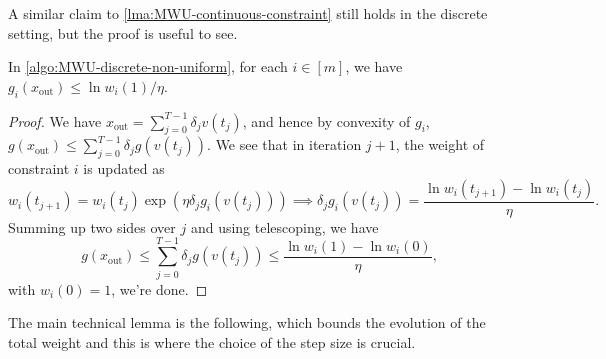 A similar claim to \autoref{lma:MWU-continuous-constraint} still holds in the discrete setting, but the proof is useful to see.

\begin{lemma}\label{lma:MWU-discrete-non-uniform-constraint}
	In \autoref{algo:MWU-discrete-non-uniform}, for each \(i \in [m]\), we have \(g_i(x _{\text{out} }) \leq \ln w_i(1) / \eta \).
\end{lemma}
\begin{proof}
	We have \(x_{\text{out} } = \sum_{j=0}^{T-1} \delta _j v(t_j)\), and hence by convexity of \(g_i\), \(g(x_{\text{out} }) \leq \sum_{j=0}^{T-1} \delta _j g(v(t_j))\). We see that in iteration \(j+1\), the weight of constraint \(i\) is updated as
	\[
		w_i(t_{j+1})
		= w_i(t_j) \exp (\eta \delta _j g_i(v(t_j)))
		\implies \delta _j g_i(v(t_j))
		= \frac{\ln w_i(t_{j+1}) - \ln w_i(t_j)}{\eta }.
	\]
	Summing up two sides over \(j\) and using telescoping, we have
	\[
		g(x_{\text{out} })
		\leq \sum_{j=0}^{T-1} \delta _j g(v(t_j))
		\leq \frac{\ln w_i(1) - \ln w_i(0)}{\eta },
	\]
	with \(w_i(0) = 1\), we're done.
\end{proof}

The main technical lemma is the following, which bounds the evolution of the total weight and this is where the choice of the step size is crucial.

